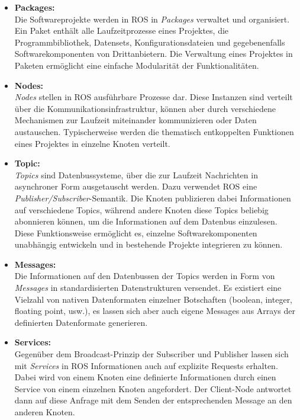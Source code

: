 \begin{itemize}
	\item \textbf{\textsf{Packages:}}\\ Die Softwareprojekte werden in \acs{ROS} in \emph{Packages} verwaltet und organisiert. Ein Paket enthält alle Laufzeitprozesse eines Projektes, die Programmbibliothek, Datensets, Konfigurationsdateien und gegebenenfalls Softwarekomponenten von Drittanbietern. Die Verwaltung eines Projektes in Paketen ermöglicht eine einfache Modularität der Funktionalitäten.
	
	\item \textbf{\textsf{Nodes:}}\\ \emph{Nodes} stellen in \acs{ROS} ausführbare Prozesse dar. Diese Instanzen sind verteilt über die Kommunikationsinfrastruktur, können aber durch verschiedene Mechanismen zur Laufzeit miteinander kommunizieren oder Daten austauschen. Typischerweise werden die thematisch entkoppelten Funktionen eines Projektes in einzelne Knoten verteilt.
	
	\item \textbf{\textsf{Topic:}}\\ \emph{Topics} sind Datenbussysteme, über die zur Laufzeit Nachrichten in asynchroner Form ausgetauscht werden. Dazu verwendet \acs{ROS} eine \emph{Publisher/Subscriber}-Semantik. Die Knoten publizieren dabei Informationen auf verschiedene Topics, während andere Knoten diese Topics beliebig abonnieren können, um die Informationen auf dem Datenbus einzulesen. Diese Funktionsweise ermöglicht es, einzelne Softwarekomponenten unabhängig entwickeln und in bestehende Projekte integrieren zu können. 
	
	\item \textbf{\textsf{Messages:}}\\ Die Informationen auf den Datenbussen der Topics werden in Form von \emph{Messages} in standardisierten Datenstrukturen versendet. Es existiert eine Vielzahl von nativen Datenformaten einzelner Botschaften (boolean, integer, floating point, usw.), es lassen sich aber auch eigene Messages aus Arrays der definierten Datenformate generieren.
	
	\item \textbf{\textsf{Services:}}\\ Gegenüber dem Broadcast-Prinzip der Subscriber und Publisher lassen sich mit \emph{Services} in \acs{ROS} Informationen auch auf explizite Requests erhalten. Dabei wird von einem Knoten eine definierte Informationen durch einen Service von einem einzelnen Knoten angefordert. Der Client-Node antwortet dann auf diese Anfrage mit dem Senden der entsprechenden Message an den anderen Knoten.
\end{itemize}
